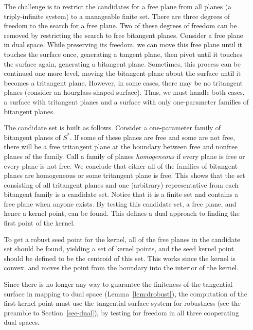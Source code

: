 \documentclass{acmsiggraph}
\begin{document}
The challenge is to restrict the candidates for a free plane from
all planes (a triply-infinite system) to a manageable finite set.
There are three degrees of freedom to the search for a free plane.
Two of these degrees of freedom can be removed by restricting the search
to free bitangent planes.
Consider a free plane in dual space.
While preserving its freedom, we can move this free plane
until it touches the surface once, generating a tangent plane,
then pivot until it touches the surface again, generating a bitangent plane.
Sometimes, this process can be continued one more level,
moving the bitangent plane about the surface until it becomes a
tritangent plane.
However, in some cases, there may be no tritangent planes
(consider an hourglass-shaped surface).
Thus, we must handle both cases, a surface with tritangent planes
and a surface with only one-parameter families of bitangent planes.

The candidate set is built as follows.
Consider a one-parameter family of bitangent planes of $S^*$.
If some of these planes are free and some are not free,
there will be a free tritangent plane at the boundary
between free and nonfree planes of the family.
Call a family of planes {\em homogeneous} if every plane is
free or every plane is not free.
We conclude that either all of the families of bitangent planes
are homogeneous or some tritangent plane is free.
This shows that the set consisting of all tritangent planes
and one (arbitrary) representative from each bitangent family
is a candidate set.
Notice that it is a finite set and contains a free plane when anyone exists.
By testing this candidate set, a free plane, and hence a kernel point, can be found.
This defines a dual approach to finding the first point of the kernel.

To get a robust seed point for the kernel,
all of the free planes in the candidate set should be found,
yielding a set of kernel points, and the seed kernel point 
should be defined to be the centroid of this set.
This works since the kernel is convex, and moves the point from the boundary
into the interior of the kernel.

Since there is no longer any way to guarantee the finiteness of the tangential surface
in mapping to dual space (Lemma~\ref{lem:drobust}),
the computation of the first kernel point must use the tangential surface system 
for robustness (see the preamble to Section~\ref{sec-dual}),
by testing for freedom in all three cooperating dual spaces.

\end{document}

